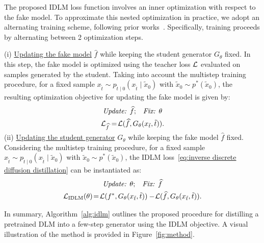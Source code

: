     The proposed IDLM loss function involves an inner optimization with respect to the fake model.
    To approximate this nested optimization in practice, we adopt an alternating training scheme,
    following prior works~\citep{yin2024one, yin2024improved, gushchin2025inverse, kornilov2025universal}.
Specifically, training proceeds by alternating between 2 optimization steps.

    (i) \underline{Updating the fake model} $\widehat{f}$ while keeping the student generator $G_{\theta}$ fixed. In this step, the fake model is optimized using the teacher loss $\mathcal{L}$ evaluated on samples generated by the student. Taking into account the multistep training procedure, for a fixed sample $x_{\tilde{t}} \sim p_{\tilde{t} \mid 0}(x_{\tilde{t}} \mid \tilde{x}_0)$ with $\tilde{x}_0 \sim p^*(\tilde{x}_0)$, the resulting optimization objective for updating the fake model is given by:
    \vspace{-1mm}
    \begin{gather}
    \label{eq:update fake in practice}
      \text{\textit{Update:} } \widehat{f} \text{;} \quad \text{\textit{Fix:} } \theta  \\
      \LC_{\widehat{f}} = \! \LC(\widehat{f}, G_{\theta}(x_{\tilde{t}}, \tilde{t})). \nonumber
    \vspace{-1mm}
    \end{gather}
    (ii) \underline{Updating the student generator} $G_{\theta}$ while keeping the fake model $\widehat{f}$ fixed. Considering the multistep training procedure, for a fixed sample $x_{\tilde{t}} \sim p_{\tilde{t} \mid 0}(x_{\tilde{t}} \mid \tilde{x}_0)$ with $\tilde{x}_0 \sim p^*(\tilde{x}_0)$, the IDLM loss~\eqref{eq:inverse discrete diffusion distillation} can be instantiated as:
    \vspace{-2mm}
    \begin{gather}
        \label{eq:update generator in practice}
        \text{\textit{Update:} } \theta \text{;} \quad \text{\textit{Fix:} } \widehat{f} \\
        \mathcal{L}_{\text{IDLM}}(\theta) \!=\! \mathcal{L}(f^*, G_{\theta}(x_{\tilde{t}}, \tilde{t}))-
      \! \mathcal{L}(\widehat{f}, G_{\theta}(x_{\tilde{t}}, \tilde{t})). \nonumber
    \end{gather}
    
\vspace{-3mm}
  In summary, Algorithm~\ref{alg:idlm} outlines the proposed procedure for distilling a pretrained DLM into a few-step generator using the IDLM objective. A visual illustration of the method is provided in Figure~\ref{fig:method}.
